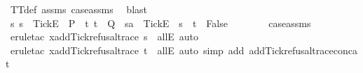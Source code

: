 {\ TT{}{\isacharunderscore}def\ assms{\isacharparenleft}{}{\isacharparenright}\ case{\isacharunderscore}assms{\isacharparenleft}{}{\isacharparenright}\ \isamarkupfalse%
\ blast\isanewline
\ \ \isamarkupfalse%
\ {\isachardoublequoteopen}{\isasymforall}s{\isachardot}\ s\ {\isacharat}\ {\isacharbrackleft}{\isacharbrackleft}Tick{\isacharbrackright}\isactrlsub E{\isacharbrackright}\ {\isasymin}\ P\ {\isasymlongrightarrow}\ {\isacharparenleft}{\isasymforall}t{\isachardot}\ t\ {\isasymin}\ Q\ {\isasymlongrightarrow}\ sa\ {\isacharat}\ {\isacharbrackleft}{\isacharbrackleft}Tick{\isacharbrackright}\isactrlsub E{\isacharbrackright}\ {\isasymnoteq}\ s\ {\isacharat}\ t{\isacharparenright}\ {\isasymLongrightarrow}\ False{\isachardoublequoteclose}\isanewline
\ \ \ \ \isamarkupfalse%
\ {}\ {}\ case{\isacharunderscore}assms\ \isamarkupfalse%
\ {\isacharparenleft}erule{\isacharunderscore}tac\ x{\isacharequal}{\isachardoublequoteopen}add{\isacharunderscore}Tick{\isacharunderscore}refusal{\isacharunderscore}trace\ s{\isachardoublequoteclose}\ \ allE{\isacharcomma}\ auto{\isacharparenright}\isanewline
\ \ \ \ \isamarkupfalse%
\ {\isacharparenleft}erule{\isacharunderscore}tac\ x{\isacharequal}{\isachardoublequoteopen}add{\isacharunderscore}Tick{\isacharunderscore}refusal{\isacharunderscore}trace\ t{\isachardoublequoteclose}\ \ allE{\isacharcomma}\ auto\ simp\ add{\isacharcolon}\ add{\isacharunderscore}Tick{\isacharunderscore}refusal{\isacharunderscore}trace{\isacharunderscore}concat{\isacharparenright}\isanewline
{}\isamarkupfalse%
%
\endisatagproof
{\isafoldproof}%
%
\isadelimproof
%
\endisadelimproof
%
}%

